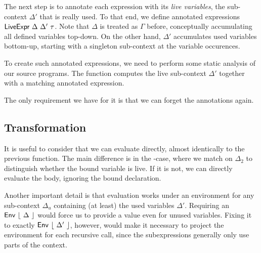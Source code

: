 \documentclass[11pt,a4paper]{article}
\newcommand{\AgdaFloor}[1]{\AgdaFunction{$\lfloor$}\ #1\ \AgdaFunction{$\rfloor$}}
\begin{document}
The next step is to annotate each expression with its \emph{live variables},
the sub-context $\Delta'$ that is really used.
To that end, we define annotated expressions
$\AgdaDatatype{LiveExpr}\ \Delta\ \Delta'\ \tau$.
Note that $\Delta$ is treated as $\Gamma$ before,
conceptually accumulating all defined variables top-down.
On the other hand, $\Delta'$ accumulates used variables bottom-up,
starting with a singleton sub-context at the variable occurences.

\CodeLiveExpr

To create such annotated expressions, we need to perform
some static analysis of our source programs.
The function  computes the live sub-context $\Delta'$
together with a matching annotated expression.

\CodeLiveAnalyse

The only requirement we have for it is that we can forget the annotations again.

\CodeLiveForgetSignature

\CodeLiveAnalysePreservesSignature


\subsection{Transformation}

It is useful to consider that we can evaluate  directly,
almost identically to the previous  function.
The main difference is in the -case,
where we match on $\Delta_2$ to distinguish whether the bound variable is live.
If it is not, we can directly evaluate the body, ignoring the bound declaration.

Another important detail is that evaluation works under an environment
for any sub-context $\Delta_u$
containing (at least) the used variables $\Delta'$.
Requiring an $\AgdaDatatype{Env}\ \AgdaFloor{\Delta}$ would force us
to provide a value even for unused variables.
Fixing it to exactly $\AgdaDatatype{Env}\ \AgdaFloor{\Delta'}$, however,
would make it necessary to project the environment for each recursive call,
since the subexpressions generally only use parts of the context.
\end{document}

